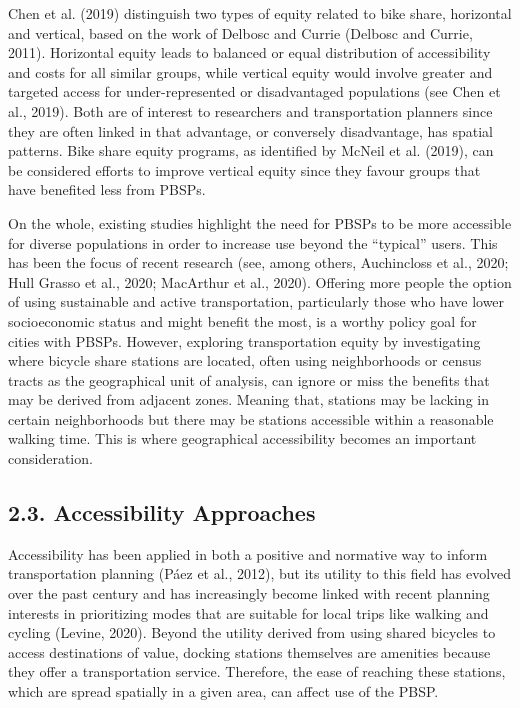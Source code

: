 \documentclass[]{elsarticle} %
\begin{document}
Chen et al. (2019) distinguish two types of equity related to bike
share, horizontal and vertical, based on the work of Delbosc and Currie
(Delbosc and Currie, 2011). Horizontal equity leads to balanced or equal
distribution of accessibility and costs for all similar groups, while
vertical equity would involve greater and targeted access for
under-represented or disadvantaged populations (see Chen et al., 2019).
Both are of interest to researchers and transportation planners since
they are often linked in that advantage, or conversely disadvantage, has
spatial patterns. Bike share equity programs, as identified by McNeil et
al. (2019), can be considered efforts to improve vertical equity since
they favour groups that have benefited less from PBSPs.

On the whole, existing studies highlight the need for PBSPs to be more
accessible for diverse populations in order to increase use beyond the
``typical'' users. This has been the focus of recent research (see,
among others, Auchincloss et al., 2020; Hull Grasso et al., 2020;
MacArthur et al., 2020). Offering more people the option of using
sustainable and active transportation, particularly those who have lower
socioeconomic status and might benefit the most, is a worthy policy goal
for cities with PBSPs. However, exploring transportation equity by
investigating where bicycle share stations are located, often using
neighborhoods or census tracts as the geographical unit of analysis, can
ignore or miss the benefits that may be derived from adjacent zones.
Meaning that, stations may be lacking in certain neighborhoods but there
may be stations accessible within a reasonable walking time. This is
where geographical accessibility becomes an important consideration.

\hypertarget{accessibility-approaches}{%
\subsection{2.3. Accessibility
Approaches}\label{accessibility-approaches}}

Accessibility has been applied in both a positive and normative way to
inform transportation planning (Páez et al., 2012), but its utility to
this field has evolved over the past century and has increasingly become
linked with recent planning interests in prioritizing modes that are
suitable for local trips like walking and cycling (Levine, 2020). Beyond
the utility derived from using shared bicycles to access destinations of
value, docking stations themselves are amenities because they offer a
transportation service. Therefore, the ease of reaching these stations,
which are spread spatially in a given area, can affect use of the PBSP.
\end{document}
